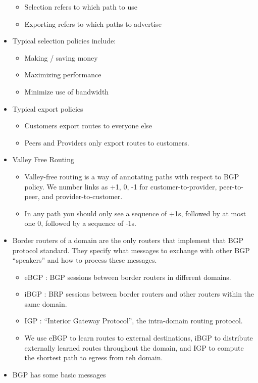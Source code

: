 \documentclass[]{article}
\providecommand{\tightlist}{%
  \setlength{\itemsep}{0pt}\setlength{\parskip}{0pt}}
\begin{document}
\begin{itemize}
  \begin{itemize}
  \tightlist
  \item
    Selection refers to which path to use
  \item
    Exporting refers to which paths to advertise
  \end{itemize}
\item
  Typical selection policies include:

  \begin{itemize}
  \tightlist
  \item
    Making / saving money
  \item
    Maximizing performance
  \item
    Minimize use of bandwidth
  \end{itemize}
\item
  Typical export policies

  \begin{itemize}
  \tightlist
  \item
    Customers export routes to everyone else
  \item
    Peers and Providers only export routes to customers.
  \end{itemize}
\item
  Valley Free Routing

  \begin{itemize}
  \tightlist
  \item
    Valley-free routing is a way of annotating paths with respect to BGP
    policy. We number links as +1, 0, -1 for customer-to-provider,
    peer-to-peer, and provider-to-customer.
  \item
    In any path you should only see a sequence of +1s, followed by at
    most one 0, followed by a sequence of -1s.
  \end{itemize}
\item
  Border routers of a domain are the only routers that implement that
  BGP protocol standard. They specify what messages to exchange with
  other BGP ``speakers'' and how to process these messages.

  \begin{itemize}
  \tightlist
  \item
    eBGP : BGP sessions between border routers in different domains.
  \item
    iBGP : BRP sessions between border routers and other routers within
    the same domain.
  \item
    IGP : ``Interior Gateway Protocol'', the intra-domain routing
    protocol.
  \item
    We use eBGP to learn routes to external destinations, iBGP to
    distribute externally learned routes throughout the domain, and IGP
    to compute the shortest path to egress from teh domain.
  \end{itemize}
\item
  BGP has some basic messages


\end{itemize}
\end{document}
